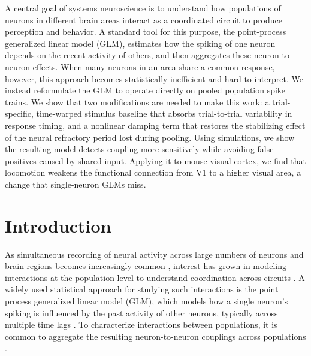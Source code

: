 \documentclass[12pt]{article}
\begin{document}
A central goal of systems neuroscience is to understand how populations of neurons in different brain areas interact as a coordinated circuit to produce perception and behavior. A standard tool for this purpose, the point-process generalized linear model (GLM), estimates how the spiking of one neuron depends on the recent activity of others, and then aggregates these neuron-to-neuron effects. When many neurons in an area share a common response, however, this approach becomes statistically inefficient and hard to interpret. We instead reformulate the GLM to operate directly on pooled population spike trains. We show that two modifications are needed to make this work: a trial-specific, time-warped stimulus baseline that absorbs trial-to-trial variability in response timing, and a nonlinear damping term that restores the stabilizing effect of the neural refractory period lost during pooling. Using simulations, we show the resulting model detects coupling more sensitively while avoiding false positives caused by shared input. Applying it to mouse visual cortex, we find that locomotion weakens the functional connection from V1 to a higher visual area, a change that single-neuron GLMs miss.

\section{Introduction}

As simultaneous recording of neural activity across large numbers of neurons and brain regions becomes increasingly common \cite{jun2017fully, siegle2021survey, steinmetz2021neuropixels, machado2022multiregion}, interest has grown in modeling interactions at the population level to understand coordination across circuits \cite{kass2023identification, kang2020approaches, semedo2020statistical}. A widely used statistical approach for studying such interactions is the point process generalized linear model (GLM), which models how a single neuron’s spiking is influenced by the past activity of other neurons, typically across multiple time lags \cite{kass2023identification, keeley2020modeling}. To characterize interactions between populations, it is common to aggregate the resulting neuron-to-neuron couplings across populations \cite{yates2017functional, hart2020recurrent, zoltowski2018scaling, stevenson2008bayesian}.
\end{document}
